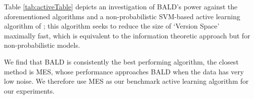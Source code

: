 Table \ref{tab:activeTable} depicts an investigation of BALD's power against the aforementioned algorithms and a non-probabilistic SVM-based active learning algorithm of \citep{tong2001}; this algorithm seeks to reduce the size of `Version Space' maximally fast, which is equivalent to the information theoretic approach but for non-probabilistic models.  

We find that BALD is consistently the best performing algorithm, the closest method is MES, whose performance approaches BALD when the data has very low noise.  
We therefore use MES as our benchmark active learning algorithm for our experiments.


